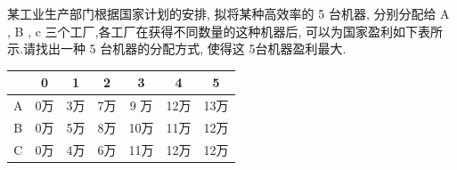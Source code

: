 \documentclass[../../main.tex]{subfiles}
\begin{document}
\begin{problem}
某工业生产部门根据国家计划的安排, 拟将某种高效率的 5 台机器, 分别分配给 A , B , c 三个工厂,各工厂在获得不同数量的这种机器后,
可以为国家盈利如下表所示.请找出一种 5 台机器的分配方式, 使得这 5台机器盈利最大.
\end{problem}
\begin{table}[ht]
    \centering
    \begin{tabular}{|c|c|c|c|c|c|c|}
        \hline
          & 0  & 1  & 2  & 3   & 4   & 5   \\  \hline
        A & 0万 & 3万 & 7万 & 9 万 & 12万 & 13万 \\ \hline
        B & 0万 & 5万 & 8万 & 10万 & 11万 & 12万 \\ \hline
        C & 0万 & 4万 & 6万 & 11万 & 12万 & 12万 \\ \hline
    \end{tabular}
\end{table}
\end{document}
